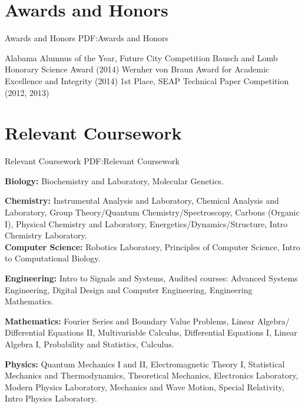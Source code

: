 \documentclass[letterpaper,10pt,oneside]{article}
\begin{document}
\begin{body}

\section
{Awards and Honors}
{Awards and Honors}
{PDF:Awards and Honors}

 Alabama Alumnus of the Year, Future City Competition 
\BulletItem
Bausch and Lomb Honorary Science Award (2014) 
\BulletItem
Wernher von Braun Award for Academic Excellence and Integrity (2014)
\BulletItem 
1st Place, SEAP Technical Paper Competition (2012, 2013)


\section
{Relevant Coursework}
{Relevant Coursework}
{PDF:Relevant Coursework}

\Gap
{\textbf{Biology:}}
Biochemistry and Laboratory,
Molecular Genetics.

\Gap
{\textbf{Chemistry:}}
Instrumental Analysis and Laboratory,
Chemical Analysis and Laboratory,
Group Theory/Quantum Chemistry/Spectroscopy,
Carbons (Organic I),
Physical Chemistry and Laboratory,
Energetics/Dynamics/Structure,
Intro Chemistry Laboratory. \\

\Gap
{\textbf{Computer Science:}}
Robotics Laboratory,
Principles of Computer Science,
Intro to Computational Biology.

\Gap
{\textbf{Engineering:}}
Intro to Signals and Systems,
Audited courses:
Advanced Systems Engineering,
Digital Design and Computer Engineering,
Engineering Mathematics.

\Gap
{\textbf{Mathematics:}}
Fourier Series and Boundary Value Problems,
Linear Algebra/ Differential Equations II,
Multivariable Calculus,
Differential Equations I,
Linear Algebra I,
Probability and Statistics,
Calculus.

{\textbf{Physics:}}
Quantum Mechanics I and II,
Electromagnetic Theory I,
Statistical Mechanics and Thermodynamics,
Theoretical Mechanics,
Electronics Laboratory,
Modern Physics Laboratory,
Mechanics and Wave Motion,
Special Relativity,
Intro Physics Laboratory.

\iffalse
{\textbf{Non-technical Courses:}}
Global Environmental Politics,
Socratic Dialogues,
Parties and Campaigns, 
Financial Economics,
Activism, Vocation, Justice, and Special Topics in Religious Studies,
Intermediate Spanish, 
Ballet, 
African Dance,
Mexican Folk Dance, 
Jazz Dance,
Independent Study in Leadership.
\fi


\end{body}
\end{document}

